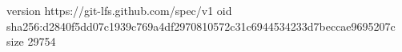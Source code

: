 version https://git-lfs.github.com/spec/v1
oid sha256:d2840f5dd07c1939c769a4df2970810572c31c6944534233d7beccae9695207c
size 29754
